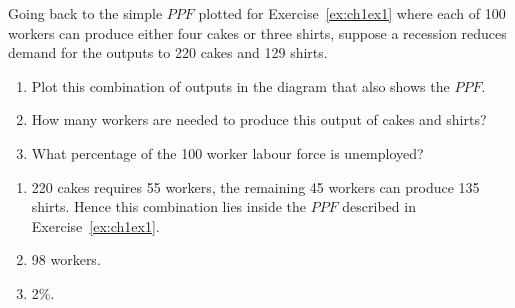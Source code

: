 \begin{enumialphparenastyle}
\begin{econex}\label{ex:ch1ex7}
Going back to the simple $PPF$ plotted for Exercise~\ref{ex:ch1ex1} where each of 100 workers can produce either four cakes or three shirts, suppose a recession reduces demand for the outputs to 220 cakes and 129 shirts.
\begin{enumerate}
	\item	Plot this combination of outputs in the diagram that also shows the $PPF$.
	\item	How many workers are needed to produce this output of cakes and shirts?
	\item	What percentage of the 100 worker labour force is unemployed?
\end{enumerate}
\begin{econsolution}
\begin{enumerate}
	\item	220 cakes requires 55 workers, the remaining 45 workers can produce 135 shirts. Hence this combination lies inside the $PPF$ described in Exercise~\ref{ex:ch1ex1}.
	\item	98 workers.
	\item	2\%.
\end{enumerate}
\end{econsolution}
\end{econex}

\end{enumialphparenastyle}
